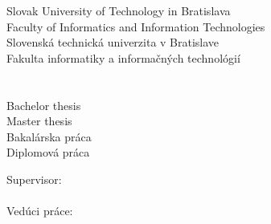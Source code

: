
\begin{center}
\thispagestyle{empty}
{
	{\Large Slovak University of Technology in Bratislava}\textbf{}\\
	{\Large Faculty of Informatics and Information Technologies}\textbf{}\\[\baselineskip]
}
{
	{\Large Slovenská technická univerzita v Bratislave}\textbf{}\\
	{\Large Fakulta informatiky a informačných technológií}\textbf{}\\[\baselineskip]
}
\vspace*{5cm}
{\Large \Author}\textbf{}\\[\baselineskip]
{\huge \Title}\textbf{}\\[\baselineskip]
{
	{
		{\large Bachelor thesis}\\
	}
	{
		{\large Master thesis}\\
	}
}
{
	{
		{\large Bakalárska práca}\\
	}
	{
		{\large Diplomová práca}\\
	}
}

\end{center}
\vspace*{6.5cm}
{
	Supervisor: \Supervisor \\\\
}
{
	Vedúci práce: \Supervisor \\\\
}
\Month\ \Year

